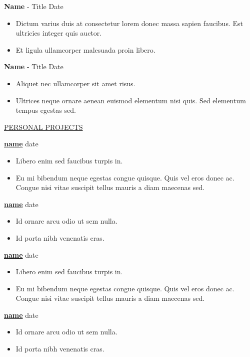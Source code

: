 \documentclass[11pt]{article}
\newcommand{\betteruline}[1]{
    \uline{#1}
}
\newcommand{\sectiontitle}[1]{
    \begingroup
        \titlebold
        \betteruline{\Large\uppercase{#1}  }
        \vspace{1.7mm}
    \endgroup
}
\newcommand{\sectioncontent}[1]{
    \begingroup
        \begin{FlushLeft}
        \vspace{-3mm}
        \sffamily\small#1
        \end{FlushLeft}
    \endgroup
    \vspace{2mm}
}
\newcommand{\job}[3]{
    \begingroup
        \textbf{\small#1} - \small#2
        \hfill\color{black!70}\small{#3}
    \endgroup
}
\newcommand{\project}[2]{
    \begingroup
        \textbf{\small#1}
        \hfill\color{black!70}\small{#2}
    \endgroup
}
\newcommand{\spacevv}{
    \vspace{2mm}
}
\begin{document}
\begin{paracol}{2}
{      \job{Name}{Title}{Date}
      \begin{itemize}
        \item Dictum varius duis at consectetur lorem donec massa sapien faucibus. Est ultricies integer quis auctor. 
        \item Et ligula ullamcorper malesuada proin libero. 
      \end{itemize}
      \spacevv

      \job{Name}{Title}{Date}
      \begin{itemize}
        \item Aliquet nec ullamcorper sit amet risus. 
        \item Ultrices neque ornare aenean euismod elementum nisi quis. Sed elementum tempus egestas sed.
      \end{itemize}
    }

    \sectiontitle{personal projects}
    \sectioncontent{

        \project{\href{example.com}{name}}{date}
        \begin{itemize}
            \item  Libero enim sed faucibus turpis in. 
            \item Eu mi bibendum neque egestas congue quisque. Quis vel eros donec ac. Congue nisi vitae suscipit tellus mauris a diam maecenas sed.
        \end{itemize}
        \spacevv

        \project{\href{example.com}{name}}{date}
        \begin{itemize}
            \item Id ornare arcu odio ut sem nulla. 
            \item Id porta nibh venenatis cras. 
        \end{itemize}
        \spacevv
       
        \project{\href{example.com}{name}}{date}
        \begin{itemize}
            \item  Libero enim sed faucibus turpis in. 
            \item Eu mi bibendum neque egestas congue quisque. Quis vel eros donec ac. Congue nisi vitae suscipit tellus mauris a diam maecenas sed.
        \end{itemize}
        \spacevv

        \project{\href{example.com}{name}}{date}
        \begin{itemize}
            \item Id ornare arcu odio ut sem nulla. 
            \item Id porta nibh venenatis cras. 
        \end{itemize}
        \spacevv
    }


\end{paracol}
\end{document}
